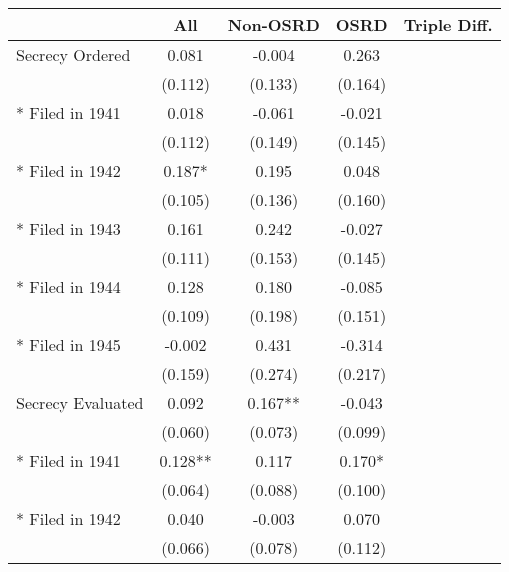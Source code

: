 {
\def\sym#1{\ifmmode^{#1}\else\(^{#1}\)\fi}
\begin{tabular}{l*{4}{c}}
\hline\hline
                        &\multicolumn{1}{c}{All}&\multicolumn{1}{c}{Non-OSRD}&\multicolumn{1}{c}{OSRD}&\multicolumn{1}{c}{Triple Diff.}\\
\hline
Secrecy Ordered         &       0.081   &      -0.004   &       0.263   &               \\
                        &     (0.112)   &     (0.133)   &     (0.164)   &               \\
 * Filed in 1941        &       0.018   &      -0.061   &      -0.021   &               \\
                        &     (0.112)   &     (0.149)   &     (0.145)   &               \\
 * Filed in 1942        &       0.187*  &       0.195   &       0.048   &               \\
                        &     (0.105)   &     (0.136)   &     (0.160)   &               \\
 * Filed in 1943        &       0.161   &       0.242   &      -0.027   &               \\
                        &     (0.111)   &     (0.153)   &     (0.145)   &               \\
 * Filed in 1944        &       0.128   &       0.180   &      -0.085   &               \\
                        &     (0.109)   &     (0.198)   &     (0.151)   &               \\
 * Filed in 1945        &      -0.002   &       0.431   &      -0.314   &               \\
                        &     (0.159)   &     (0.274)   &     (0.217)   &               \\
Secrecy Evaluated       &       0.092   &       0.167** &      -0.043   &               \\
                        &     (0.060)   &     (0.073)   &     (0.099)   &               \\
 * Filed in 1941        &       0.128** &       0.117   &       0.170*  &               \\
                        &     (0.064)   &     (0.088)   &     (0.100)   &               \\
 * Filed in 1942        &       0.040   &      -0.003   &       0.070   &               \\
                        &     (0.066)   &     (0.078)   &     (0.112)   &               \\

\end{tabular}}

